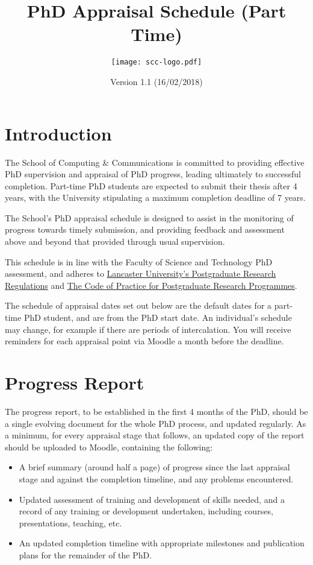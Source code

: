 \documentclass[12pt,a4paper]{article}
\title{PhD Appraisal Schedule (Part Time)}
\author{\texttt{[image: scc-logo.pdf]}}
\date{Version 1.1 (16/02/2018)}
\begin{document}
\maketitle

\section{Introduction}
The School of Computing \& Communications is committed to providing effective PhD supervision and appraisal of PhD progress, leading ultimately to successful completion. Part-time PhD students are expected to submit their thesis after 4 years, with the University stipulating a maximum completion deadline of 7 years.

The School's PhD appraisal schedule is designed to assist in the monitoring of progress towards timely submission, and providing feedback and assessment above and beyond that provided through usual supervision.

This schedule is in line with the Faculty of Science and Technology PhD assessment, and adheres to
\href{https://gap.lancs.ac.uk/ASQ/QAE/MARP/Documents/PGR-Regs.pdf}{Lancaster University's Postgraduate Research Regulations} and 
\href{https://gap.lancs.ac.uk/ASQ/Policies/Documents/Postgraduate-Research-Code-of-Practice.pdf}{The Code of Practice for Postgraduate Research Programmes}.

The schedule of appraisal dates set out below are the default dates for a part-time PhD student, and are from the PhD start date. An individual's schedule may change, for example if there are periods of intercalation. You will receive reminders for each appraisal point via Moodle a month before the deadline.

\section{Progress Report}
The progress report, to be established in the first 4 months of the PhD, should be a single evolving document for the whole PhD process, and updated regularly. As a minimum, for every appraisal stage that follows, an updated copy of the report should be uploaded to Moodle, containing the following:
\begin{itemize}
	\item A brief summary (around half a page) of progress since the last appraisal stage and against the completion timeline, and any problems encountered.
	\item Updated assessment of training and development of skills needed, and a record of any training or development undertaken, including courses, presentations, teaching, etc.\
	\item An updated completion timeline with appropriate milestones and publication plans for the remainder of the PhD.
\end{itemize}
\end{document}
